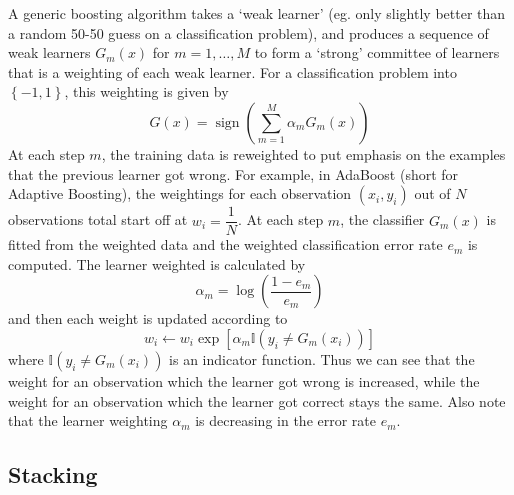 \documentclass[11pt]{report} %
\begin{document}
A generic boosting algorithm takes a `weak learner' (eg. only slightly better than a random 50-50 guess on a classification problem), and produces a sequence of weak learners $G_{m}\left(x\right)$ for $m = 1, \dots, M$ to form a `strong' committee of learners that is a weighting of each weak learner. For a classification problem into $\left\{-1, 1\right\}$, this weighting is given by
\begin{equation}
G\left(x\right) = \operatorname{sign}\left(\sum_{m = 1}^{M}\alpha_{m}G_{m}\left(x\right)\right)
\end{equation}
At each step $m$, the training data is reweighted to put emphasis on the examples that the previous learner got wrong. For example, in AdaBoost \cite{Hastie2009, Zhou2012} (short for Adaptive Boosting), the weightings for each observation $\left(x_{i}, y_{i}\right)$ out of $N$ observations total start off at $w_{i} = \dfrac{1}{N}$. At each step $m$, the classifier $G_{m}\left(x\right)$ is fitted from the weighted data and the weighted classification error rate $e_{m}$ is computed. The learner weighted is calculated by
\begin{equation}
\alpha_{m} = \log\left(\dfrac{1 - e_{m}}{e_{m}}\right)
\end{equation}
and then each weight is updated according to
\begin{equation}
w_{i} \gets w_{i}\exp\left[\alpha_{m}\mathbb{I}\left(y_{i} \neq G_{m}\left(x_{i}\right)\right)\right]
\end{equation}
where $\mathbb{I}\left(y_{i} \neq G_{m}\left(x_{i}\right)\right)$ is an indicator function. Thus we can see that the weight for an observation which the learner got wrong is increased, while the weight for an observation which the learner got correct stays the same. Also note that the learner weighting $\alpha_{m}$ is decreasing in the error rate $e_{m}$.

\subsection{Stacking}
\end{document}
